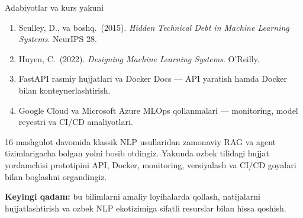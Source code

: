 \documentclass[aspectratio=169,11pt]{beamer}
\newcommand{\uzq}{\textquotesingle{}}   %
\begin{document}
\begin{frame}{Adabiyotlar va kurs yakuni}
  \small

  \begin{enumerate}\setlength\itemsep{4pt}
    \item Sculley, D., va boshq.\ (2015).
          \textit{Hidden Technical Debt in Machine Learning Systems}.
          NeurIPS 28.

    \item Huyen, C.\ (2022).
          \textit{Designing Machine Learning Systems}.
          O'Reilly.

    \item FastAPI rasmiy hujjatlari va Docker Docs ---
          API yaratish hamda Docker bilan konteynerlashtirish.

    \item Google Cloud va Microsoft Azure MLOps qo\uzq{}llanmalari ---
          monitoring, model reyestri va CI/CD amaliyotlari.
  \end{enumerate}

  \vspace{5pt}

  \begin{tcolorbox}[okbox,title={Tabriklaymiz!},top=2pt,bottom=2pt,left=4pt,right=4pt]
    \footnotesize
    16 mashg\uzq{}ulot davomida klassik NLP usullaridan zamonaviy
    RAG va agent tizimlarigacha bo\uzq{}lgan yo\uzq{}lni bosib o\uzq{}tdingiz.
    Yakunda o\uzq{}zbek tilidagi hujjat yordamchisi prototipini API, Docker,
    monitoring, versiyalash va CI/CD g\uzq{}oyalari bilan bog\uzq{}lashni
    o\uzq{}rgandingiz.
  \end{tcolorbox}

  \vspace{3pt}

  \begin{tcolorbox}[defbox,top=2pt,bottom=2pt,left=4pt,right=4pt]
    \footnotesize
    \textbf{Keyingi qadam:}
    bu bilimlarni amaliy loyihalarda qo\uzq{}llash,
    natijalarni hujjatlashtirish va o\uzq{}zbek NLP ekotizimiga sifatli
    resurslar bilan hissa qo\uzq{}shish.
  \end{tcolorbox}
\end{frame}

\appendix
\end{document}
